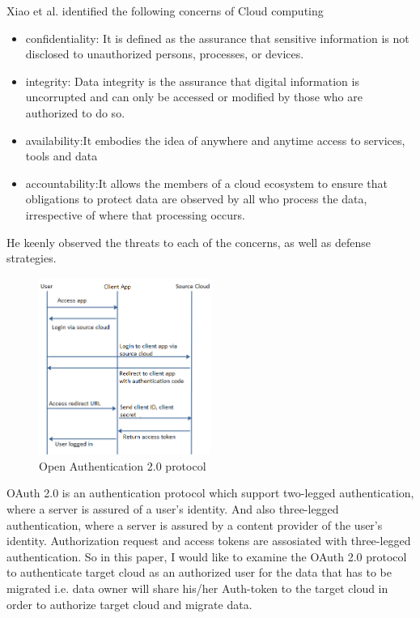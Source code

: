 \documentclass[11pt, pdftex, conference]{IEEEtran}
\begin{document}
Xiao et al. \cite{5} identified the following concerns of Cloud computing
\begin{itemize} 
\item{confidentiality: It is defined as the assurance that sensitive information is not disclosed to unauthorized persons, processes, or devices.} 
\item{integrity: Data integrity is the assurance that digital information is uncorrupted and can only be accessed or modified by those who are authorized to do so.} 
\item{availability:It embodies the idea of anywhere and anytime access to services, tools and data}
\item{accountability:It allows the members of a cloud ecosystem to ensure that obligations to protect data are observed by all who process the data, irrespective of where that processing occurs.} 
\end{itemize}
 He keenly observed the threats to each of the concerns, as well as defense strategies.
\linebreak
\begin{figure}
\includegraphics[width=0.5\textwidth]{oauth}
\caption{Open Authentication 2.0 protocol}
\end{figure}
OAuth 2.0 is an authentication protocol which support two-legged authentication\cite{15}, where a server is assured of a user's identity. And also three-legged authentication, where a server is assured by a content provider of the user's identity. Authorization request and access tokens are assosiated with three-legged authentication. So in this paper, I would like to examine the OAuth 2.0 protocol to authenticate target cloud as an authorized user for the data that has to be migrated i.e. data owner will share his/her Auth-token to the target cloud in order to authorize target cloud and migrate data. 
\linebreak
\end{document}
